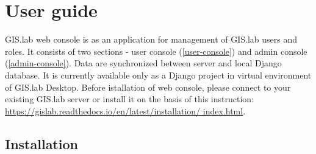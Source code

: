 \chapter{User guide}
\label{user-guide}

GIS.lab web console is as an application for management of GIS.lab
users and roles. It consists of two sections - user console
(\ref{user-console}) and admin console (\ref{admin-console}). Data are
synchronized between  server and local Django database. It is
currently available only as a Django project in virtual environment of
GIS.lab Desktop. Before istallation of web console, please connect to
your existing GIS.lab server or install it on the basis of this
instruction:
\href{https://gislab.readthedocs.io/en/latest/installation/index.html}{https://gislab.readthedocs.io/en/latest/installation/\linebreak
  index.html}.

\section{Installation}
\label{installation}

